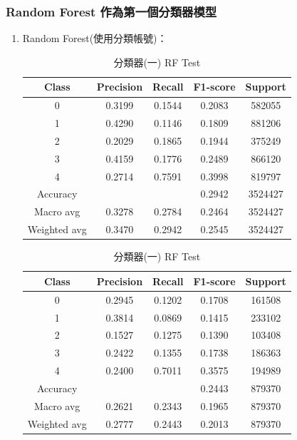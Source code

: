     \subsubsection{Random Forest 作為第一個分類器模型}
    \begin{enumerate}

        \item Random Forest(使用分類帳號)：

        \begin{table}[H]
        \centering
        \scriptsize
        \begin{minipage}{0.48\textwidth}
        \centering
        \begin{tabular}{c|cccc}
        \hline
        Class & Precision & Recall & F1-score & Support \\
        \hline
        0 & 0.3199 & 0.1544 & 0.2083 & 582055 \\
        1 & 0.4290 & 0.1146 & 0.1809 & 881206 \\
        2 & 0.2029 & 0.1865 & 0.1944 & 375249 \\
        3 & 0.4159 & 0.1776 & 0.2489 & 866120 \\
        4 & 0.2714 & 0.7591 & 0.3998 & 819797 \\
        \hline
        Accuracy &       &       & 0.2942 & 3524427 \\
        Macro avg & 0.3278 & 0.2784 & 0.2464 & 3524427 \\
        Weighted avg & 0.3470 & 0.2942 & 0.2545 & 3524427 \\
        \hline
        \end{tabular}
        \caption{分類器(一) RF Train}
        \label{tab:classifier_1_report_train_rf_filtered}
        \end{minipage}%
        \hfill
        \begin{minipage}{0.48\textwidth}
        \centering
        \begin{tabular}{c|cccc}
        \hline
        Class & Precision & Recall & F1-score & Support \\
        \hline
        0 & 0.2945 & 0.1202 & 0.1708 & 161508 \\
        1 & 0.3814 & 0.0869 & 0.1415 & 233102 \\
        2 & 0.1527 & 0.1275 & 0.1390 & 103408 \\
        3 & 0.2422 & 0.1355 & 0.1738 & 186363 \\
        4 & 0.2400 & 0.7011 & 0.3575 & 194989 \\
        \hline
        Accuracy &       &       & 0.2443 & 879370 \\
        Macro avg & 0.2621 & 0.2343 & 0.1965 & 879370 \\
        Weighted avg & 0.2777 & 0.2443 & 0.2013 & 879370 \\
        \hline
        \end{tabular}
        \caption{分類器(一) RF Test}
        \label{tab:classifier_1_report_test_rf_filtered}
        \end{minipage}
        \end{table}


\end{enumerate}
